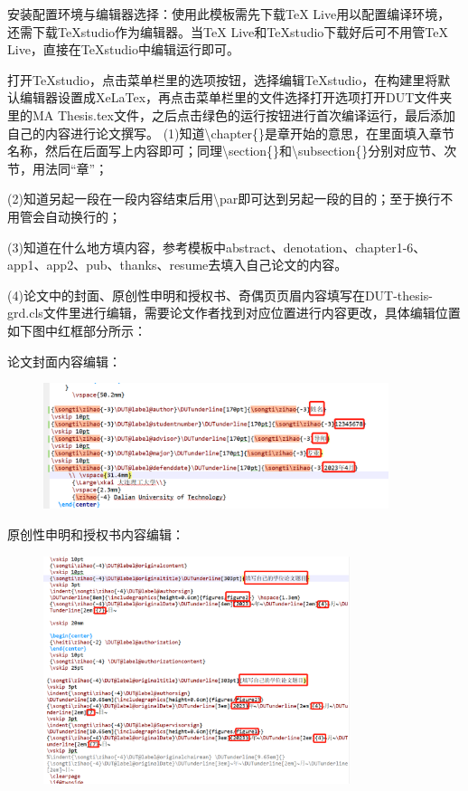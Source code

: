 
安装配置环境与编辑器选择：使用此模板需先下载TeX Live用以配置编译环境，还需下载TeXstudio作为编辑器。当TeX Live和TeXstudio下载好后可不用管TeX Live，直接在TeXstudio中编辑运行即可。\par
打开TeXstudio，点击菜单栏里的选项按钮，选择编辑TeXstudio，在构建里将默认编辑器设置成XeLaTex，再点击菜单栏里的文件选择打开选项打开DUT文件夹里的MA Thesis.tex文件，之后点击绿色的运行按钮进行首次编译运行，最后添加自己的内容进行论文撰写。
(1)知道\textbackslash chapter\{\}是章开始的意思，在{}里面填入章节名称，然后在后面写上内容即可；同理\textbackslash section\{\}和\textbackslash subsection\{\}分别对应节、次节，用法同“章”；\par
(2)知道另起一段在一段内容结束后用\textbackslash par即可达到另起一段的目的；至于换行不用管会自动换行的；\par
(3)知道在什么地方填内容，参考模板中abstract、denotation、chapter1-6、app1、app2、pub、thanks、resume去填入自己论文的内容。\par
(4)论文中的封面、原创性申明和授权书、奇偶页页眉内容填写在DUT-thesis-grd.cls文件里进行编辑，需要论文作者找到对应位置进行内容更改，具体编辑位置如下图中红框部分所示：\par
论文封面内容编辑：\par
\begin{figure}[!ht]
	\centering
	\includegraphics[width=0.9\textwidth]{figures/figure10}
\end{figure}
原创性申明和授权书内容编辑：\par
\begin{figure}[H]
	\centering
	\includegraphics[width=0.8\textwidth,height=0.5\textwidth]{figures/figure11}
\end{figure}
